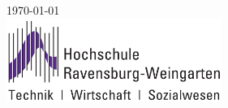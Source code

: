 \documentclass[a4paper,11pt,singlespacing]{article}
\begin{document}
\begin{titlepage}
	
	
	{\large \today}\\[3cm] %
	
	
	
	\includegraphics[width=7cm]{images/logo.png} %
	
	
	\vfill %
	
\end{titlepage}

\tableofcontents
\pagebreak










\printbibliography[heading=bibintoc]
\end{document}
